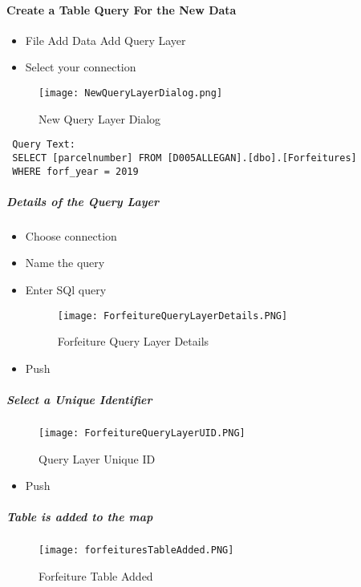  \paragraph{Create a Table Query For the New Data}
 \vspace{.25in}

 \begin{itemize}
 \setlength\itemsep{.2in}
 \item {\Large File \menuArrow Add Data \menuArrow Add Query Layer}
 \item {\Large Select your connection}
 \end{itemize}
 \begin{figure}[h!]
 \centering
     \texttt{[image: NewQueryLayerDialog.png]}
 \caption{New Query Layer Dialog}
 \end{figure}
 \begin{verbatim}
 Query Text:
 SELECT [parcelnumber] FROM [D005ALLEGAN].[dbo].[Forfeitures]
 WHERE forf_year = 2019
 \end{verbatim}
 \clearpage
 \subparagraph{Details of the Query Layer}
 \begin{itemize}
 \item Choose connection
 \item Name the query
 \item Enter SQl query
 \begin{figure}[h!]
 \centering
     \texttt{[image: ForfeitureQueryLayerDetails.PNG]}
 \caption{Forfeiture Query Layer Details}
 \end{figure}
 \item Push 
 \end{itemize}
 \clearpage
 \subparagraph{Select a Unique Identifier}
 \begin{figure}[h!]
 \centering
     \texttt{[image: ForfeitureQueryLayerUID.PNG]}
 \caption{Query Layer Unique ID}
 \end{figure}
 \begin{itemize}
 \item Push 
 \end{itemize}
 \clearpage
 \subparagraph*{Table is added to the map}
 \begin{figure}[h!]
 \centering
     \texttt{[image: forfeituresTableAdded.PNG]}
 \caption{Forfeiture Table Added}
 \end{figure}
 \clearpage

